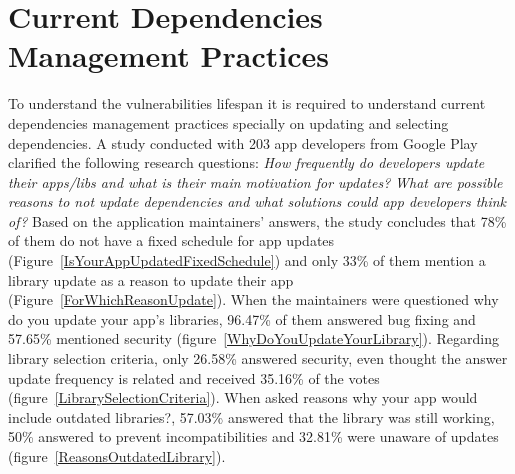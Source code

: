 \documentclass[pdf,bookmarks,colorlinks=true]{IEEEtran}
\begin{document}

\section{Current Dependencies Management Practices}
\label{sec:DependenciesManagement}


To understand the vulnerabilities lifespan it is required to understand current dependencies management practices specially on updating and selecting dependencies. A study \cite{Derr2017} conducted with 203 app developers from Google Play clarified the following research questions: {\em How frequently do developers update their apps/libs and what is their main motivation for updates?}
{\em What are possible reasons to not update dependencies and what solutions could app developers think of?}
Based on the application maintainers' answers, the study concludes that 78\% of them do not have a fixed schedule for app updates (Figure~\ref{IsYourAppUpdatedFixedSchedule}) and only 33\% of them mention a library update as a reason to update their app (Figure~\ref{ForWhichReasonUpdate}). When the maintainers were questioned why do you update your app's libraries, 96.47\% of them answered bug fixing and 57.65\% mentioned security (figure~\ref{WhyDoYouUpdateYourLibrary}). Regarding library selection criteria, only 26.58\% answered security, even thought the answer update frequency is related and received 35.16\% of the votes (figure~\ref{LibrarySelectionCriteria}). When asked reasons why your app would include outdated libraries?, 57.03\% answered that the library was still working, 50\% answered to prevent incompatibilities and 32.81\% were unaware of updates (figure~\ref{ReasonsOutdatedLibrary}).
\end{document}
